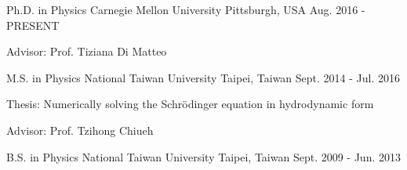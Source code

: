


\begin{cventries}


\cventry
{Ph.D. in Physics} %
{Carnegie Mellon University} %
{Pittsburgh, USA} %
{Aug. 2016 - PRESENT} %
{ %
\begin{cvitems}
\item {Advisor: Prof. Tiziana Di Matteo}
\end{cvitems}
}

\cventry
{M.S. in Physics} %
{National Taiwan University} %
{Taipei, Taiwan} %
{Sept. 2014 - Jul. 2016} %
{ %
\begin{cvitems}
\item {Thesis: Numerically solving the Schrödinger equation in hydrodynamic form}
\item {Advisor: Prof. Tzihong Chiueh }
\end{cvitems}
}

\cventry
{B.S. in Physics} %
{National Taiwan University} %
{Taipei, Taiwan} %
{Sept. 2009 - Jun. 2013} %
{%
}



\end{cventries}